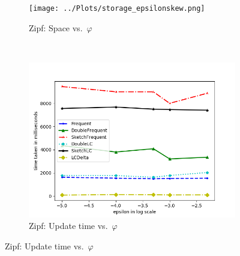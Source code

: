 \documentclass[sigconf,review=true,anonymous=true,screen]{acmart}
\renewcommand{\phi}{\varphi}
\begin{document}
\begin{figure}
\centering
\begin{subfigure}[b]{0.3\textwidth}
\texttt{[image: ../Plots/storage\_epsilonskew.png]}
\caption{Zipf: Space vs.~$\phi$}
\end{subfigure}
~
\begin{subfigure}[b]{0.3\textwidth}
\includegraphics[width=\textwidth]{../Plots/time_epsilonskew.png}
\caption{Zipf: Update time vs.~$\phi$}
\end{subfigure}


\end{figure}
\end{document}
